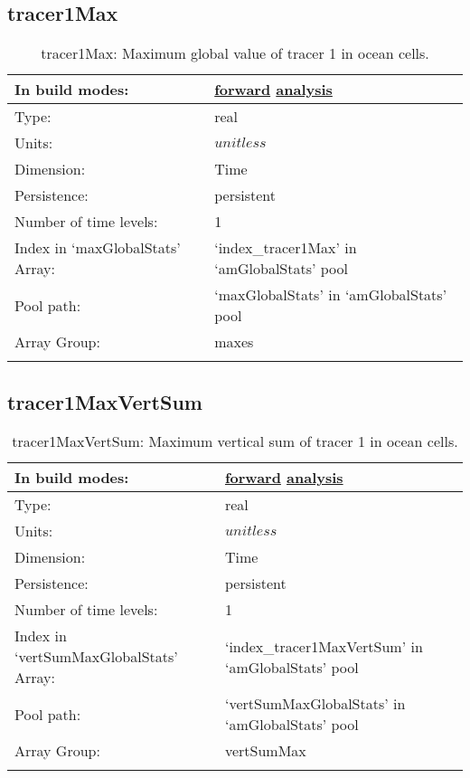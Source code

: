 \subsection[tracer1Max]{tracer1Max}
\label{subsec:var_sec_amGlobalStats_tracer1Max}
\begin{center}
\begin{longtable}{| p{2.0in} | p{4.0in} |}
        \hline 
        In build modes: & \hyperref[subsec:forward_var_tab_amGlobalStats]{forward} \hyperref[subsec:analysis_var_tab_amGlobalStats]{analysis} \\
        \hline 
        Type: & real \\
        \hline 
        Units: & $unitless$ \\
        \hline 
        Dimension: & Time \\
        \hline 
        Persistence: & persistent \\
        \hline 
        Number of time levels: & 1 \\
        \hline 
		 Index in `maxGlobalStats' Array: & `index\_tracer1Max' in `amGlobalStats' pool \\
		 \hline 
            Pool path: & `maxGlobalStats' in `amGlobalStats' pool \\
		 \hline 
		 Array Group: & maxes \\
		 \hline 
    \caption{tracer1Max: Maximum global value of tracer 1 in ocean cells.}
\end{longtable}
\end{center}
\subsection[tracer1MaxVertSum]{tracer1MaxVertSum}
\label{subsec:var_sec_amGlobalStats_tracer1MaxVertSum}
\begin{center}
\begin{longtable}{| p{2.0in} | p{4.0in} |}
        \hline 
        In build modes: & \hyperref[subsec:forward_var_tab_amGlobalStats]{forward} \hyperref[subsec:analysis_var_tab_amGlobalStats]{analysis} \\
        \hline 
        Type: & real \\
        \hline 
        Units: & $unitless$ \\
        \hline 
        Dimension: & Time \\
        \hline 
        Persistence: & persistent \\
        \hline 
        Number of time levels: & 1 \\
        \hline 
		 Index in `vertSumMaxGlobalStats' Array: & `index\_tracer1MaxVertSum' in `amGlobalStats' pool \\
		 \hline 
            Pool path: & `vertSumMaxGlobalStats' in `amGlobalStats' pool \\
		 \hline 
		 Array Group: & vertSumMax \\
		 \hline 
    \caption{tracer1MaxVertSum: Maximum vertical sum of tracer 1 in ocean cells.}
\end{longtable}
\end{center}

